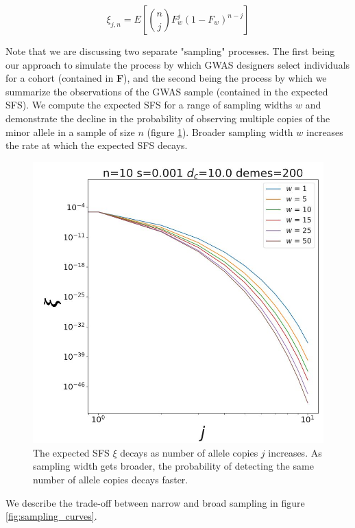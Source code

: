 \begin{equation}\label{eq:sfs}
    \xi_{j,n} = E[{n \choose j} F_w^j(1-F_w)^{n-j}]
\end{equation}


Note that we are discussing two separate "sampling" processes. The first being our approach to simulate the process by which GWAS designers select individuals for a cohort (contained in \textbf{F}), and the second being the process by which we summarize the observations of the GWAS sample (contained in the expected SFS). We compute the expected SFS for a range of sampling widths $w$ and demonstrate the decline in the probability of observing multiple copies of the minor allele in a sample of size $n$ (figure \ref{fig:sfs}). Broader sampling width $w$ increases the rate at which the expected SFS decays. 


\begin{figure}[h]
    \centering
    \hspace*{-1.5cm}
    \includegraphics[scale=0.5]{img/sfs.JPG}
    \caption{The expected SFS $\xi$ decays as number of allele copies $j$ increases. As sampling width gets broader, the probability of detecting the same number of allele copies decays faster.}
    \label{fig:sfs}
\end{figure}


We describe the trade-off between narrow and broad sampling in figure \ref{fig:sampling_curves}. 

